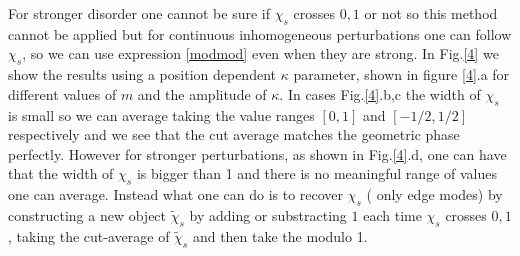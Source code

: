 \documentclass[twocolumn,amsmath,longbibliography,amssymb,superscriptaddress]{revtex4-1}
\newcommand{\carlos}[1]{{\color{red} #1}}
\begin{document}
For stronger disorder one cannot be sure if $\chi_s$ crosses $0,1$ or not so this method cannot be applied but for continuous inhomogeneous perturbations one can follow $\chi_s$, so we can use expression \ref{modmod} even when they are strong. In Fig.\ref{4} we show the results using a position dependent $\kappa$ parameter, shown in figure \ref{4}.a for different values of $m$ and the amplitude of $\kappa$. In cases Fig.\ref{4}.b,c the width of $\chi_s$ is small so we can average taking the value ranges $[0,1]$ and $[-1/2,1/2]$ respectively and we see that the cut average matches the geometric phase perfectly. However for stronger perturbations, as shown in Fig.\ref{4}.d, one can have that the width of $\chi_s$ is bigger than 1 and there is no meaningful range of values one can average. Instead what one can do is to recover $\chi_s$ (\carlos{ only edge modes}) by constructing a new object $\tilde{\chi}_s$ by adding or substracting $1$ each time $\chi_s$ crosses $0,1$, taking the cut-average of $\tilde{\chi}_s$ and then take the modulo 1. 
\end{document}
